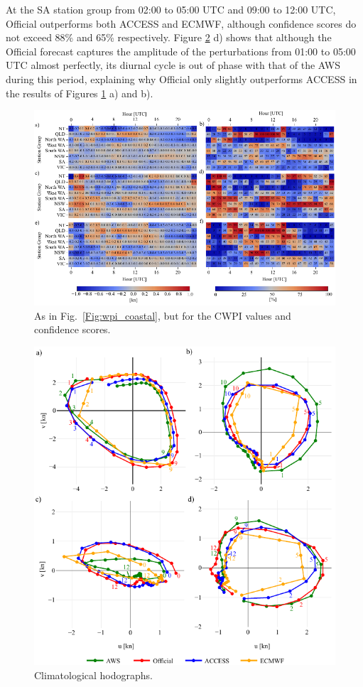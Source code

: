 \documentclass{ametsoc}
\begin{document}
At the SA station group from 02:00 to 05:00 UTC and 09:00 to 12:00 UTC, Official outperforms both ACCESS and ECMWF, although confidence scores do not exceed 88\% and 65\% respectively. Figure \ref{Fig:clim_hodo} d) shows that although the Official forecast captures the amplitude of the perturbations from 01:00 to 05:00 UTC almost perfectly, its diurnal cycle is out of phase with that of the AWS during this period, explaining why Official only slightly outperforms ACCESS in the results of Figures \ref{Fig:cwpi_coastal} a) and b).

\begin{figure}
\centering
\includegraphics[width=39pc]{cwpi_coastal.pdf}
\caption{As in Fig.~\ref{Fig:wpi_coastal}, but for the CWPI values and confidence scores.}
\label{Fig:cwpi_coastal}
\end{figure}

\begin{figure}
\centering
\includegraphics[width=33pc]{clim_hodo.pdf}
\caption{Climatological hodographs.}
\label{Fig:clim_hodo}
\end{figure}
\end{document}
